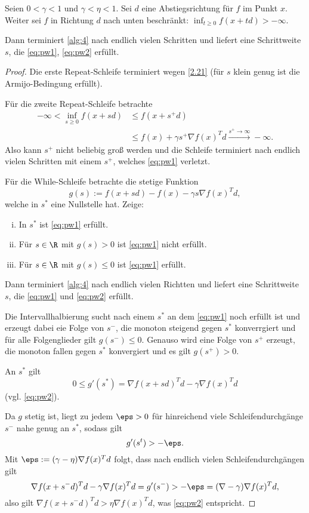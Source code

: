 \begin{st} \label{2.38}
	Seien $0<\gamma<1$ und $\gamma<\eta<1$.
	Sei $d$ eine Abstiegsrichtung für $f$ im Punkt $x$.
	Weiter sei $f$ in Richtung $d$ nach unten beschränkt: $\inf_{t\ge 0}f(x+td) > -\infty$.

	Dann terminiert \ref{alg:4} nach endlich vielen Schritten und liefert eine Schrittweite $s$, die \ref{eq:pw1}, \ref{eq:pw2} erfüllt.
	\begin{proof}
		Die erste Repeat-Schleife terminiert wegen \ref{2.21} (für $s$ klein genug ist die Armijo-Bedingung erfüllt).

		Für die zweite Repeat-Schleife betrachte
		\begin{align*}
			-\infty
			< \inf_{s\ge 0} f(x+sd)
			&\le f(x+s^+ d) \\
			&\le f(x) + \gamma s^+ \nabla f(x)^T d
			\xrightarrow{s^+\to\infty} -\infty.
		\end{align*}
		Also kann $s^+$ nicht beliebig groß werden und die Schleife terminiert nach endlich vielen Schritten mit einem $s^+$, welches \ref{eq:pw1} verletzt.

		Für die While-Schleife betrachte die stetige Funktion
		\[
			g(s) := f(x+sd) - f(x) - \gamma s \nabla f(x)^T d,
		\]
		welche in $s^*$ eine Nullstelle hat.
		Zeige:
		\begin{enumerate}[(i)]
			\item
				In $s^*$ ist \ref{eq:pw1} erfüllt.
			\item
				Für $s \in \R$ mit $g(s) > 0$ ist \ref{eq:pw1} nicht erfüllt.
			\item
				Für $s \in \R$ mit $g(s) \le 0$ ist \ref{eq:pw1} erfüllt.
		\end{enumerate}
		Dann terminiert \ref{alg:4} nach endlich vielen Richtten und liefert eine Schrittweite $s$, die \ref{eq:pw1} und \ref{eq:pw2} erfüllt.

		Die Intervallhalbierung sucht nach einem $s^*$ an dem \ref{eq:pw1} noch erfüllt ist und erzeugt dabei eie Folge von $s^-$, die monoton steigend gegen $s^*$ konverrgiert und für alle Folgenglieder gilt $g(s^-) \le 0$.
		Genauso wird eine Folge von $s^+$ erzeugt, die monoton fallen gegen $s^*$ konvergiert und es gilt $g(s^+) > 0$.

		An $s^*$ gilt
		\[
			0
			\le g'(s^*)
			= \nabla f(x+sd)^T d - \gamma \nabla f(x)^T d
		\]
		(vgl. \ref{eq:pw2}).

		Da $g$ stetig ist, liegt zu jedem $\eps > 0$ für hinreichend viele Schleifendurchgänge $s^-$ nahe genug an $s^*$, sodass gilt
		\[
			g'(s^t) > - \eps.
		\]
		Mit $\eps := (\gamma - \eta) \nabla f(x)^T d$ folgt, dass nach endlich vielen Schleifendurchgängen gilt
		\[
			\nabla f(x+s^- d)^T d - \gamma \nabla f(x)^T d
			= g'(s^-)
			> - \eps
			= (\nabla - \gamma) \nabla f(x)^T d,
		\]
		also gilt $\nabla f(x+s^- d)^T d > \eta \nabla f(x)^T d$, was \ref{eq:pw2} entspricht.
	\end{proof}
\end{st}

